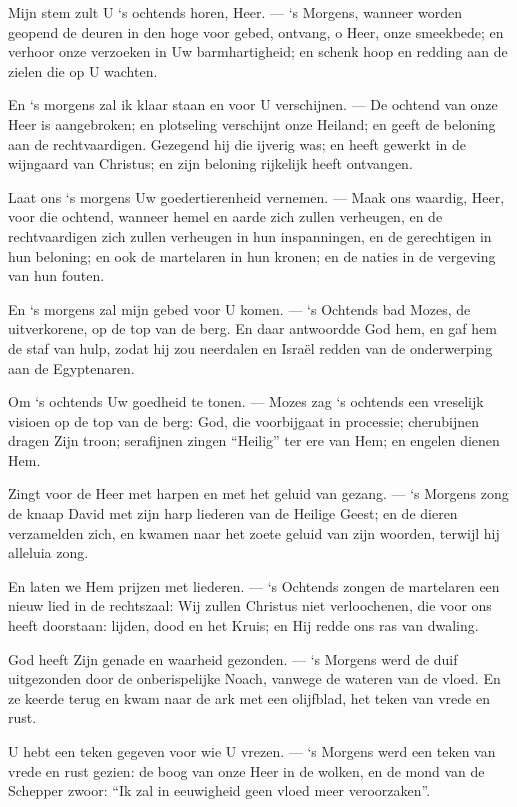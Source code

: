 \documentclass[12pt,twoside,a5paper]{article}
\newlength{\origparskip}
\newenvironment{halfparskip}{
  \setlength{\parskip}{0.5\origparskip}
}{
  \setlength{\parskip}{\origparskip}
}
\begin{document}
\begin{halfparskip}
  Mijn stem zult U `s ochtends horen, Heer. --- `s Morgens, wanneer worden geopend de deuren in den hoge voor gebed, ontvang, o Heer, onze smeekbede; en verhoor onze verzoeken in Uw barmhartigheid; en schenk hoop en redding aan de zielen die op U wachten.

  En `s morgens zal ik klaar staan en voor U verschijnen. --- De ochtend van onze Heer is aangebroken; en plotseling verschijnt onze Heiland; en geeft de beloning aan de rechtvaardigen. Gezegend hij die ijverig was; en heeft gewerkt in de wijngaard van Christus; en zijn beloning rijkelijk heeft ontvangen.

  Laat ons `s morgens Uw goedertierenheid vernemen. --- Maak ons waardig, Heer, voor die ochtend, wanneer hemel en aarde zich zullen verheugen, en de rechtvaardigen zich zullen verheugen in hun inspanningen, en de gerechtigen in hun beloning; en ook de martelaren in hun kronen; en de naties in de vergeving van hun fouten.

  En `s morgens zal mijn gebed voor U komen. --- `s Ochtends bad Mozes, de uitverkorene, op de top van de berg. En daar antwoordde God hem, en gaf hem de staf van hulp, zodat hij zou neerdalen en Israël redden van de onderwerping aan de Egyptenaren.

  Om `s ochtends Uw goedheid te tonen. --- Mozes zag `s ochtends een vreselijk visioen op de top van de berg: God, die voorbijgaat in processie; cherubijnen dragen Zijn troon; serafijnen zingen ``Heilig'' ter ere van Hem; en engelen dienen Hem.

  Zingt voor de Heer met harpen en met het geluid van gezang. --- `s Morgens zong de knaap David met zijn harp liederen van de Heilige Geest; en de dieren verzamelden zich, en kwamen naar het zoete geluid van zijn woorden, terwijl hij alleluia zong.

  En laten we Hem prijzen met liederen. --- `s Ochtends zongen de martelaren een nieuw lied in de rechtszaal: Wij zullen Christus niet verloochenen, die voor ons heeft doorstaan: lijden, dood en het Kruis; en Hij redde ons ras van dwaling.

  God heeft Zijn genade en waarheid gezonden. --- `s Morgens werd de duif uitgezonden door de onberispelijke Noach, vanwege de wateren van de vloed. En ze keerde terug en kwam naar de ark met een olijfblad, het teken van vrede en rust.

  U hebt een teken gegeven voor wie U vrezen. --- `s Morgens werd een teken van vrede en rust gezien: de boog van onze Heer in de wolken, en de mond van de Schepper zwoor: ``Ik zal in eeuwigheid geen vloed meer veroorzaken''.


\end{halfparskip}
\end{document}

